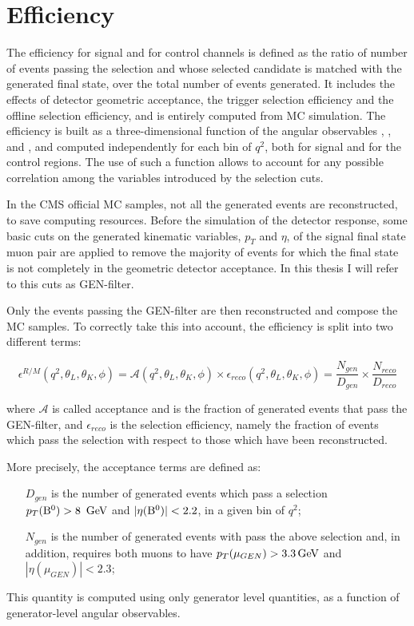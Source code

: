 \chapter{Efficiency}\label{sec:eff}

The efficiency for signal and for control channels is defined as the ratio of number of events passing the selection and whose selected candidate is matched with the generated final state, over the total number of events generated.
It includes the effects of detector geometric acceptance, the trigger selection efficiency and the offline selection efficiency, and is entirely computed from MC simulation.
The efficiency is built as a three-dimensional function of the angular observables \TL, \TK, and \PHI, and computed independently for each bin of $q^2$, both for signal and for the control regions.
The use of such a function allows to account for any possible correlation among the variables introduced by the selection cuts.

In the CMS official MC samples, not all the generated events are reconstructed, to save computing resources. Before the simulation of the detector response, some basic cuts on the generated kinematic variables, $p_T$ and $\eta$, of the signal final state muon pair are applied to remove the majority of events for which the final state is not completely in the geometric detector acceptance. In this thesis I will refer to this cuts as GEN-filter.

Only the events passing the GEN-filter are then reconstructed and compose the MC samples. To correctly take this into account, the efficiency is split into two different terms: 

\begin{equation}\label{eq:eff}
    \epsilon^{R/M}(q^2,\theta_L,\theta_K,\phi)=\mathcal{A}(q^2,\theta_L,\theta_K,\phi)\times\epsilon_{reco}(q^2,\theta_L,\theta_K,\phi)= \frac{N_{gen}}{D_{gen}}\times\frac{N_{reco}}{D_{reco}}
\end{equation}

where $\mathcal{A}$ is called acceptance and is the fraction of generated events that pass the GEN-filter, and $\epsilon_{reco}$ is the selection efficiency, namely the fraction of events which pass the selection with respect to those which have been reconstructed.

More precisely, the acceptance terms are defined as:
\begin{itemize}
    \item[$D_{gen}$] is the number of generated events which pass a selection $p_T({\textrm{B}}{}^{0})>8~\,\textrm{GeV}$ and $|\eta({\textrm{B}}{}^{0})|<2.2$, in a given bin of $q^2$;
    \item[$N_{gen}$] is the number of generated events with pass the above selection and, in addition, requires both muons to have $p_T(\mu_{GEN})>3.3\,\textrm{GeV}$ and $|\eta(\mu_{GEN})|<2.3$;
\end{itemize}
This quantity is computed using only generator level quantities, as a function of generator-level angular observables. %

